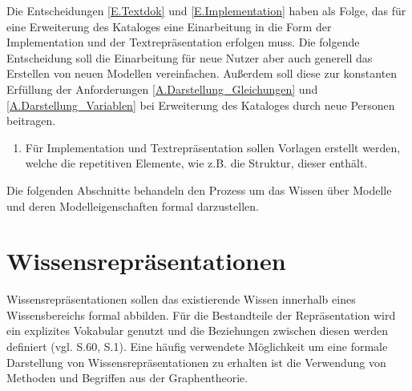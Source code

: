 Die Entscheidungen \ref{E.Textdok} und \ref{E.Implementation} haben als Folge, das für eine Erweiterung des Kataloges eine Einarbeitung in die Form der Implementation und der Textrepräsentation erfolgen muss. Die folgende Entscheidung soll die Einarbeitung für neue Nutzer aber auch generell das Erstellen von neuen Modellen vereinfachen. Außerdem soll diese zur konstanten Erfüllung der Anforderungen \ref{A.Darstellung_Gleichungen} und \ref{A.Darstellung_Variablen} bei Erweiterung des Kataloges durch neue Personen beitragen.
\begin{enumerate}[resume*]
	\item \label{E.Vorlagen}Für Implementation und Textrepräsentation sollen Vorlagen erstellt werden, welche die repetitiven Elemente, wie z.B. die Struktur, dieser enthält. 
\end{enumerate}

Die folgenden Abschnitte behandeln den Prozess um das Wissen über Modelle und deren Modelleigenschaften formal darzustellen.
\section{Wissensrepräsentationen}
\label{Ch:Vorbetrachtung:Sec:Wissensrepräsentaionen}
Wissensrepräsentationen sollen das existierende Wissen innerhalb eines Wissensbereichs formal abbilden. Für die Bestandteile der Repräsentation wird ein explizites Vokabular genutzt und die Beziehungen zwischen diesen werden definiert (vgl. \cite{BEN16} S.60, \cite{SEB04} S.1). Eine häufig verwendete Möglichkeit um eine formale Darstellung von Wissensrepräsentationen zu erhalten ist die Verwendung von Methoden und Begriffen aus der Graphentheorie.


